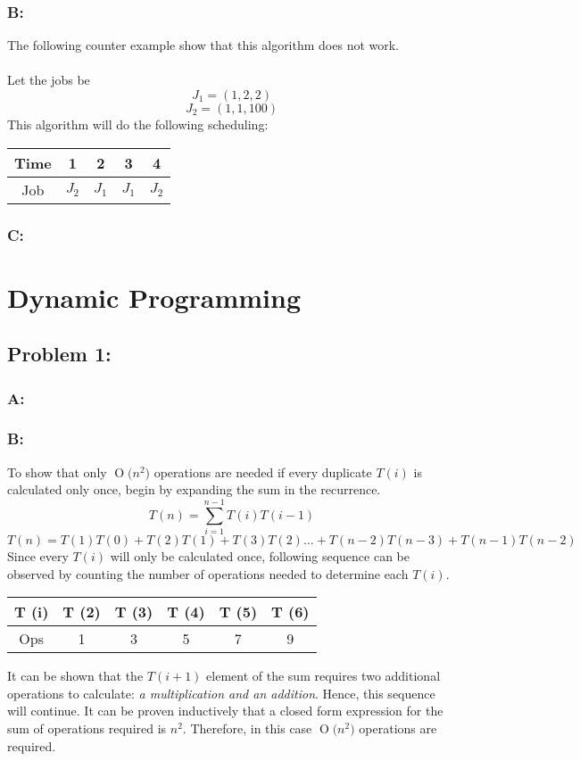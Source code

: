 \documentclass[12pt]{article}
\newcommand{\BigO}[1]{\ensuremath{\operatorname{O}\bigl(#1\bigr)}}
\begin{document}
\subsubsection*{B:}
The following counter example show that this algorithm does not work.\\\\
Let the jobs be
\[
J_1=(1,2,2)
\]
\[
J_2=(1,1,100)
\]
This algorithm will do the following scheduling:\\
\begin{center}
    \begin{tabular}{c|c|c|c|c}
    Time & 1 & 2 & 3 & 4 \\ \hline
    Job & $J_2$ & $J_1$ & $J_1$ & $J_2$ \\
    \end{tabular}
\end{center}

\subsubsection*{C:}


\section*{Dynamic Programming}
\subsection*{Problem 1:}
\subsubsection*{A:}
\subsubsection*{B:}
To show that only \BigO{n^2} operations are needed if every duplicate
$T(i)$ is calculated only once, begin by expanding the sum in the 
recurrence.
\[
T(n) = \sum_{i=1}^{n-1}T(i)T(i-1)
\]
\[ 
T(n) = T(1)T(0) + T(2)T(1) + T(3)T(2)\dots
+ T(n-2)T(n-3) + T(n-1)T(n-2)
\]
Since every $T(i)$ will only be calculated once, following sequence
can be observed by counting the number of operations needed to determine
each $T(i)$.

\begin{center}
    \begin{tabular}{c| c c c c c}
    T (i) & T (2) & T (3) & T (4) & T (5) & T (6) \\ \hline  
    Ops & 1 & 3 & 5 & 7 & 9 \\
    \end{tabular}
\end{center}
It can be shown that the $T(i+1)$ element of the sum requires two additional
operations to calculate: \textit{a multiplication and an addition}.  Hence,
this sequence will continue.  It can be proven inductively that a closed
form expression for the sum of operations required is $n^2$.  Therefore,
in this case \BigO{n^2} operations are required. 
\end{document}
